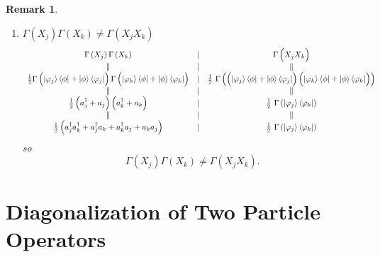 \documentclass[aps,preprint]{revtex4}%
\newtheorem{remark}[theorem]{Remark}
\begin{document}
\begin{remark}
\begin{enumerate}
\item $\Gamma\left(  X_{j}\right)  \Gamma\left(  X_{k}\right)  \neq
\Gamma\left(  X_{j}X_{k}\right)  $%
\begin{equation}%
\begin{array}
[c]{ccc}%
\Gamma\left(  X_{j}\right)  \Gamma\left(  X_{k}\right)   & {\LARGE \mid} &
\Gamma\left(  \overset{}{X_{j}}\overset{}{X_{k}}\right)  \\
\parallel & {\LARGE \mid} & \parallel\\
\frac{1}{2}\Gamma\left(  \overset{}{\left\vert \varphi_{j}\right\rangle
\left\langle \phi\right\vert +\left\vert \phi\right\rangle \left\langle
\varphi_{j}\right\vert }\right)  \Gamma\left(  \overset{}{\left\vert
\varphi_{k}\right\rangle \left\langle \phi\right\vert +\left\vert
\phi\right\rangle \left\langle \varphi_{k}\right\vert }\right)   &
{\LARGE \mid} & \frac{1}{2}\ \Gamma\left(  \left(  \overset{}{\left\vert
\varphi_{j}\right\rangle \left\langle \phi\right\vert +\left\vert
\phi\right\rangle \left\langle \varphi_{j}\right\vert }\right)  \left(
\overset{}{\left\vert \varphi_{k}\right\rangle \left\langle \phi\right\vert
+\left\vert \phi\right\rangle \left\langle \varphi_{k}\right\vert }\right)
\right)  \\
\parallel & {\LARGE \mid} & \parallel\\
\frac{1}{2}\left(  a_{j}^{\dagger}+a_{j}\right)  \left(  a_{k}^{\dagger}%
+a_{k}\right)   & {\LARGE \mid} & \frac{1}{2}\ \Gamma\left(  \left\vert
\varphi_{j}\right\rangle \left\langle \varphi_{k}\right\vert \right)  \\
\parallel & {\LARGE \mid} & \parallel\\
\frac{1}{2}\left(  a_{j}^{\dagger}a_{k}^{\dagger}+a_{j}^{\dagger}a_{k}%
+a_{k}^{\dagger}a_{j}+a_{k}a_{j}\right)   & {\LARGE \mid} & \frac{1}%
{2}\ \Gamma\left(  \left\vert \varphi_{j}\right\rangle \left\langle
\varphi_{k}\right\vert \right)
\end{array}
\end{equation}
so
\begin{equation}
\Gamma\left(  X_{j}\right)  \Gamma\left(  X_{k}\right)  \neq\Gamma\left(
X_{j}X_{k}\right)  .
\end{equation}

\end{enumerate}
\end{remark}

\section{Diagonalization of Two Particle Operators}
\end{document}
